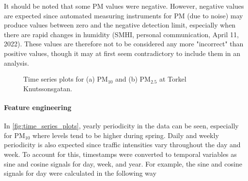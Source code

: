 It should be noted that some PM values were negative.
However, negative values are expected since automated measuring instruments for PM (due to noise) may produce values between zero and the negative detection limit, especially when there are rapid changes in humidity (SMHI, personal communication, April 11, 2022). These values are therefore not to be considered any more "incorrect" than positive values, though it may at first seem contradictory to include them in an analysis. 

\begin{figure}[h]
\centering
{}
\caption{Time series plots for (a) PM$_{10}$ and (b) PM$_{2.5}$ at Torkel Knutssonsgatan.}
\label{fig:time_series_plots}
\end{figure}


\paragraph{Feature engineering}
In \vref{fig:time_series_plots}, yearly periodicity in the data can be seen, especially for PM$_{10}$ where levels tend to be higher during spring. Daily and weekly periodicity is also expected since traffic intensities vary throughout the day and week. 
To account for this, timestamps were converted to temporal variables as sine and cosine signals for day, week, and year. For example, the sine and cosine signals for day were calculated in the following way

